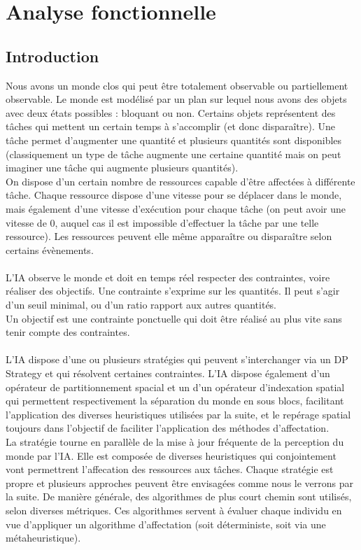 \section{Analyse fonctionnelle}
\subsection{Introduction}
Nous avons un monde clos qui peut être totalement observable ou partiellement observable. Le monde est modélisé par un plan sur lequel nous avons des objets avec deux états possibles : bloquant ou non. Certains objets représentent des tâches qui mettent un certain temps à s'accomplir (et donc disparaître). Une tâche permet d'augmenter une quantité et plusieurs quantités sont disponibles (classiquement un type de tâche augmente une certaine quantité mais on peut imaginer une tâche qui augmente plusieurs quantités).\\
On dispose d'un certain nombre de ressources capable d'être affectées à différente tâche. Chaque ressource dispose d'une vitesse pour se déplacer dans le monde, mais également d'une vitesse d'exécution pour chaque tâche (on peut avoir une vitesse de 0, auquel cas il est impossible d'effectuer la tâche par une telle ressource). Les ressources peuvent elle même apparaître ou disparaître selon certains évènements.\\\\

L'IA observe le monde et doit en temps réel respecter des contraintes, voire réaliser des objectifs. Une contrainte s'exprime sur les quantités. Il peut s'agir d'un seuil minimal, ou d'un ratio rapport aux autres quantités.\\
Un objectif est une contrainte ponctuelle qui doit être réalisé au plus vite sans tenir compte des contraintes.\\\\

L'IA dispose d'une ou plusieurs stratégies qui peuvent s'interchanger via un DP Strategy et qui résolvent certaines contraintes.
L'IA dispose également d'un opérateur de partitionnement spacial et un d'un opérateur d'indexation spatial qui permettent respectivement la séparation du monde en sous blocs, facilitant l'application des diverses heuristiques utilisées par la suite, et le repérage spatial toujours dans l'objectif de faciliter l'application des méthodes d'affectation.\\

La stratégie tourne en parallèle de la mise à jour fréquente de la perception du monde par l'IA. Elle est composée de diverses heuristiques qui conjointement vont permettrent l'affecation des ressources aux tâches.
Chaque stratégie est propre et plusieurs approches peuvent être envisagées comme nous le verrons par la suite. De manière générale, des algorithmes de plus court chemin sont utilisés, selon diverses métriques. Ces algorithmes servent à évaluer chaque individu en vue d'appliquer un algorithme d'affectation (soit déterministe, soit via une métaheuristique).\\\\

